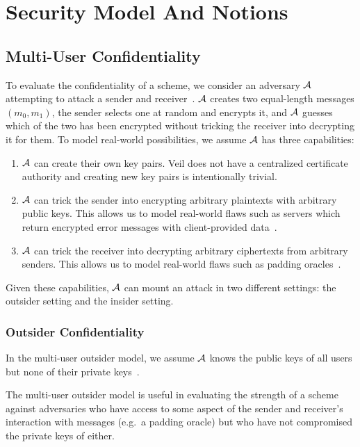 \section{Security Model And Notions}\label{sec:security-model-and-notions}

\subsection{Multi-User Confidentiality}\label{subsec:sec-conf}

To evaluate the confidentiality of a scheme, we consider an adversary $\mathcal{A}$ attempting to attack a sender and
receiver~\cite[p. 44]{baek2010}.
$\mathcal{A}$ creates two equal-length messages $(m_0, m_1)$, the sender selects one at random and encrypts it, and
$\mathcal{A}$ guesses which of the two has been encrypted without tricking the receiver into decrypting it for them.
To model real-world possibilities, we assume $\mathcal{A}$ has three capabilities:

\begin{enumerate}
    \item $\mathcal{A}$ can create their own key pairs.
    Veil does not have a centralized certificate authority and creating new key pairs is intentionally trivial.
    \item $\mathcal{A}$ can trick the sender into encrypting arbitrary plaintexts with arbitrary public keys.
    This allows us to model real-world flaws such as servers which return encrypted error messages with client-provided
    data~\cite{yu2004}.
    \item $\mathcal{A}$ can trick the receiver into decrypting arbitrary ciphertexts from arbitrary senders.
    This allows us to model real-world flaws such as padding oracles~\cite{rizzo2010practical}.
\end{enumerate}

Given these capabilities, $\mathcal{A}$ can mount an attack in two different settings: the outsider setting and the
insider setting.

\subsubsection{Outsider Confidentiality}\label{subsubsec:sec-conf-outsider}

In the multi-user outsider model, we assume $\mathcal{A}$ knows the public keys of all users but none of their private
keys~\cite[p. 44]{baek2010}.

The multi-user outsider model is useful in evaluating the strength of a scheme against adversaries who have access to
some aspect of the sender and receiver's interaction with messages (e.g.\ a padding oracle) but who have not compromised
the private keys of either.

